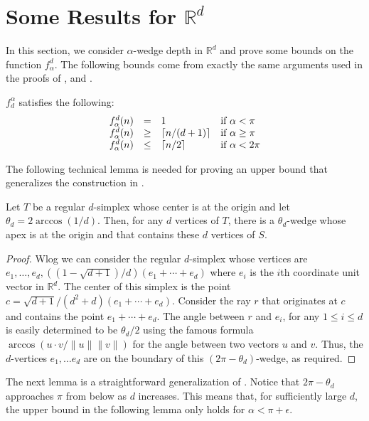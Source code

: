 \documentclass[lotsofwhite]{patmorin}
\newcommand{\blah}[1]{2\arccos(1/#1)}
\begin{document}
\section{Some Results for $\mathbb{R}^d$}

In this section, we consider $\alpha$-wedge depth in $\mathbb{R}^d$
and prove  some bounds on the function $f^d_\alpha$.  The following
bounds come from exactly the same arguments used in the proofs of
,  and .

\begin{lem}
$f^\alpha_d$ satisfies the following:
\[\begin{array}{lcll}
  f^d_\alpha(n) & = & 1 & \mbox{if $\alpha < \pi$} \\
  f^d_\alpha(n) & \ge & \left\lceil n/(d+1) \right\rceil & \mbox{if $\alpha \ge \pi$} \\
  f^d_\alpha(n) & \le & \left\lceil n/2 \right\rceil & \mbox{if $\alpha < 2\pi$} \\
\end{array}\]
\end{lem}

The following technical lemma is needed for proving an upper bound
that generalizes the construction in .

\begin{lem}
Let $T$ be a regular $d$-simplex whose center is at the origin and let
$\theta_d=\blah{d}$.  Then,
for any $d$ vertices of $T$, there is a $\theta_d$-wedge whose apex is
at the origin and that contains these $d$ vertices of $S$.
\end{lem}

\begin{proof} 
Wlog we can consider the regular $d$-simplex whose vertices are
$e_1,\ldots,e_d, ((1-\sqrt{d+1})/d)(e_1+\cdots+e_d)$ where $e_i$ is the
$i$th coordinate unit vector in $\mathbb{R}^d$.  The center of this
simplex is the point $c=\sqrt{d+1}/(d^2+d)(e_1+\cdots+ e_d)$.
Consider the ray $r$ that originates at $c$ and
contains the point $e_1+\cdots+e_d$.  The angle between $r$ and
$e_i$, for any $1\le i\le d$ is easily determined to be
$\theta_d/2$ using the famous formula $\arccos (u\cdot
v/\|u\|\|v\|)$ for the angle between two vectors $u$ and $v$.   Thus,
the $d$-vertices $e_1,\ldots e_d$ are on the boundary of this
$(2\pi-\theta_d)$-wedge, as required.  
\end{proof}

The next lemma is a straightforward generalization of .
Notice that $2\pi-\theta_d$ approaches $\pi$ from below as $d$ increases.
This means that, for sufficiently large $d$, the upper bound in the
following lemma only holds for $\alpha < \pi+\epsilon$.
\end{document}
